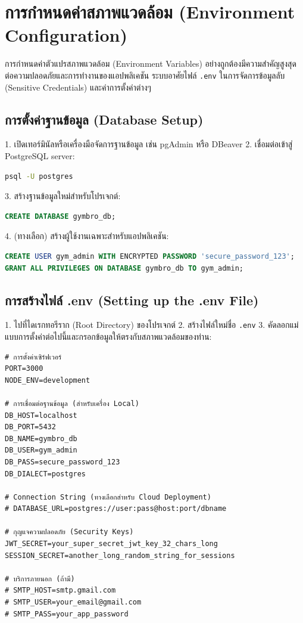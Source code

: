 \section{การกำหนดค่าสภาพแวดล้อม (Environment Configuration)}
การกำหนดค่าตัวแปรสภาพแวดล้อม (Environment Variables) อย่างถูกต้องมีความสำคัญสูงสุดต่อความปลอดภัยและการทำงานของแอปพลิเคชัน ระบบอาศัยไฟล์ \texttt{.env} ในการจัดการข้อมูลลับ (Sensitive Credentials) และค่าการตั้งค่าต่างๆ

\subsection{การตั้งค่าฐานข้อมูล (Database Setup)}
1. เปิดเทอร์มินัลหรือเครื่องมือจัดการฐานข้อมูล เช่น pgAdmin หรือ DBeaver
2. เชื่อมต่อเข้าสู่ PostgreSQL server:
\begin{lstlisting}[language=bash, frame=single]
psql -U postgres
\end{lstlisting}
3. สร้างฐานข้อมูลใหม่สำหรับโปรเจกต์:
\begin{lstlisting}[language=sql, frame=single]
CREATE DATABASE gymbro_db;
\end{lstlisting}
4. (ทางเลือก) สร้างผู้ใช้งานเฉพาะสำหรับแอปพลิเคชัน:
\begin{lstlisting}[language=sql, frame=single]
CREATE USER gym_admin WITH ENCRYPTED PASSWORD 'secure_password_123';
GRANT ALL PRIVILEGES ON DATABASE gymbro_db TO gym_admin;
\end{lstlisting}

\subsection{การสร้างไฟล์ .env (Setting up the .env File)}
1. ไปที่ไดเรกทอรีราก (Root Directory) ของโปรเจกต์
2. สร้างไฟล์ใหม่ชื่อ \texttt{.env}
3. คัดลอกแม่แบบการตั้งค่าต่อไปนี้และกรอกข้อมูลให้ตรงกับสภาพแวดล้อมของท่าน:

\begin{lstlisting}[frame=single]
# การตั้งค่าเซิร์ฟเวอร์
PORT=3000
NODE_ENV=development

# การเชื่อมต่อฐานข้อมูล (สำหรับเครื่อง Local)
DB_HOST=localhost
DB_PORT=5432
DB_NAME=gymbro_db
DB_USER=gym_admin
DB_PASS=secure_password_123
DB_DIALECT=postgres

# Connection String (ทางเลือกสำหรับ Cloud Deployment)
# DATABASE_URL=postgres://user:pass@host:port/dbname

# กุญแจความปลอดภัย (Security Keys)
JWT_SECRET=your_super_secret_jwt_key_32_chars_long
SESSION_SECRET=another_long_random_string_for_sessions

# บริการภายนอก (ถ้ามี)
# SMTP_HOST=smtp.gmail.com
# SMTP_USER=your_email@gmail.com
# SMTP_PASS=your_app_password
\end{lstlisting}

